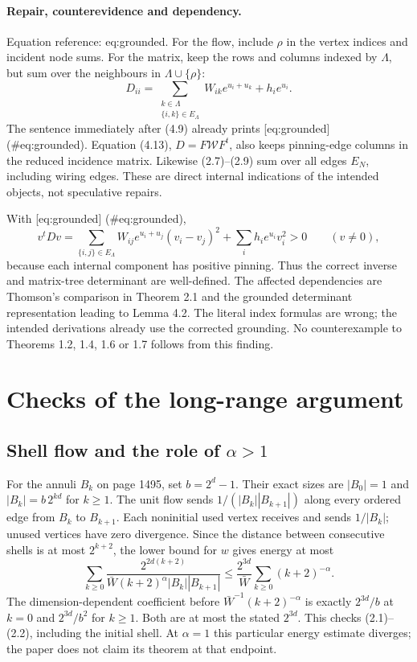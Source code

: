 \documentclass[10pt]{article}
\begin{document}
\paragraph*{Repair, counterevidence and dependency.}\mbox{}\par
Equation reference: eq:grounded. For the flow, include \(\rho\) in the vertex indices and incident node sums. For the matrix, keep the rows and columns indexed by \(\Lambda\), but sum over the neighbours in \(\Lambda\cup\{\rho\}\): \[
 D_{ii}=\sum_{\substack{k\in\Lambda\\\{i,k\}\in E_\Lambda}}
 W_{ik}e^{u_i+u_k}+h_i e^{u_i}.\] The sentence immediately after (4.9) already prints [eq:grounded] (\#eq:grounded). Equation (4.13), \(D=F\mathcal W F^t\), also keeps pinning-edge columns in the reduced incidence matrix. Likewise (2.7)–(2.9) sum over all edges \(E_N\), including wiring edges. These are direct internal indications of the intended objects, not speculative repairs.\par
With [eq:grounded] (\#eq:grounded), \[v^tDv=\sum_{\{i,j\}\in E_\Lambda}
 W_{ij}e^{u_i+u_j}(v_i-v_j)^2
 +\sum_i h_i e^{u_i}v_i^2>0\qquad(v\ne0),\] because each internal component has positive pinning. Thus the correct inverse and matrix-tree determinant are well-defined. The affected dependencies are Thomson’s comparison in Theorem 2.1 and the grounded determinant representation leading to Lemma 4.2. The literal index formulas are wrong; the intended derivations already use the corrected grounding. No counterexample to Theorems 1.2, 1.4, 1.6 or 1.7 follows from this finding.\par
\section*{Checks of the long-range argument}
\subsection*{Shell flow and the role of \(\alpha>1\)}
For the annuli \(B_k\) on page 1495, set \(b=2^d-1\). Their exact sizes are \(|B_0|=1\) and \(|B_k|=b\,2^{kd}\) for \(k\geq1\). The unit flow sends \(1/(|B_k||B_{k+1}|)\) along every ordered edge from \(B_k\) to \(B_{k+1}\). Each noninitial used vertex receives and sends \(1/|B_k|\); unused vertices have zero divergence. Since the distance between consecutive shells is at most \(2^{k+2}\), the lower bound for \(w\) gives energy at most \[\sum_{k\geq0}
 \frac{2^{2d(k+2)}}{\bar W(k+2)^\alpha |B_k||B_{k+1}|}
 \leq \frac{2^{3d}}{\bar W}\sum_{k\geq0}(k+2)^{-\alpha}.\] The dimension-dependent coefficient before \(\bar W^{-1}(k+2)^{-\alpha}\) is exactly \(2^{3d}/b\) at \(k=0\) and \(2^{3d}/b^2\) for \(k\geq1\). Both are at most the stated \(2^{3d}\). This checks (2.1)–(2.2), including the initial shell. At \(\alpha=1\) this particular energy estimate diverges; the paper does not claim its theorem at that endpoint.\par
\end{document}
